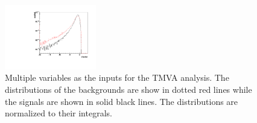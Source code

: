 \begin{figure}[htbp]
{\begin{minipage}[b]{0.3\textwidth}
	\centering
	\includegraphics[width=4cm]{tmvaCompare_zfactor.pdf}
   \end{minipage}
   }	
	\caption[Multiple variables as the inputs for the TMVA analysis.]{Multiple variables as the inputs for the TMVA analysis. The distributions of the backgrounds are show in dotted red lines while the signals are shown in solid black lines. The distributions are normalized to their integrals.\label{fig:inputParamsTMVA}}
\end{figure}

